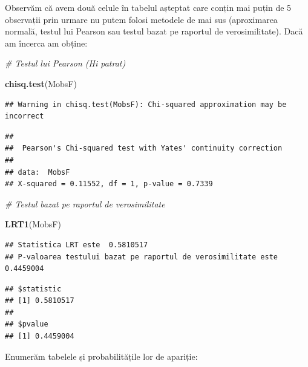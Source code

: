\documentclass[]{article}
\newenvironment{Shaded}{\begin{snugshade}}{\end{snugshade}}
\newcommand{\KeywordTok}[1]{\textcolor[rgb]{0.13,0.29,0.53}{\textbf{{#1}}}}
\newcommand{\CommentTok}[1]{\textcolor[rgb]{0.56,0.35,0.01}{\textit{{#1}}}}
\newcommand{\NormalTok}[1]{{#1}}
\begin{document}
Observăm că avem două celule în tabelul așteptat care conțin mai puțin
de 5 observații prin urmare nu putem folosi metodele de mai sus
(aproximarea normală, testul lui Pearson sau testul bazat pe raportul de
verosimilitate). Dacă am încerca am obține:

\begin{Shaded}
\begin{Highlighting}[]
\CommentTok{# Testul lui Pearson (Hi patrat)}

\KeywordTok{chisq.test}\NormalTok{(MobsF)}
\end{Highlighting}
\end{Shaded}

\begin{verbatim}
## Warning in chisq.test(MobsF): Chi-squared approximation may be incorrect
\end{verbatim}

\begin{verbatim}
## 
##  Pearson's Chi-squared test with Yates' continuity correction
## 
## data:  MobsF
## X-squared = 0.11552, df = 1, p-value = 0.7339
\end{verbatim}

\begin{Shaded}
\begin{Highlighting}[]
\CommentTok{# Testul bazat pe raportul de verosimilitate}

\KeywordTok{LRT1}\NormalTok{(MobsF)}
\end{Highlighting}
\end{Shaded}

\begin{verbatim}
## Statistica LRT este  0.5810517 
## P-valoarea testului bazat pe raportul de verosimilitate este  0.4459004
\end{verbatim}

\begin{verbatim}
## $statistic
## [1] 0.5810517
## 
## $pvalue
## [1] 0.4459004
\end{verbatim}

Enumerăm tabelele și probabilitățile lor de apariție:
\end{document}
